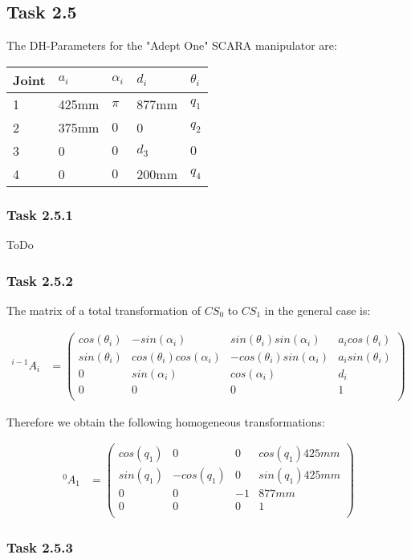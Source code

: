 \subsection*{Task 2.5}
The DH-Parameters for the "Adept One" SCARA manipulator are:
\begin{center}
	\begin{tabular}{ | l | l | l | l | l |}
		\hline
		Joint & $a_{i}$ & $\alpha_{i}$ & $d_i$ & $\theta_i$ \\ \hline
		1 & 425mm & $\pi$ & 877mm & $q_1$\\ \hline
		2 & 375mm & $0$ & 0 & $q_2$\\ \hline
		3 & 0 & $0$ & $d_3$ & $0$\\ \hline
		4 & 0 & $0$ & 200mm & $q_4$\\ \hline
	\end{tabular}
\end{center}
\subsubsection*{Task 2.5.1}
ToDo
\subsubsection*{Task 2.5.2}
The matrix of a total transformation of $CS_0$ to $CS_1$ in the general case is:

\begin{align*}
^{i-1}A_i &= 
\begin{pmatrix}
cos(\theta_i) & -sin(\alpha_i) & sin(\theta_i)sin(\alpha_i) & a_icos(\theta_i) \\
sin(\theta_i) & cos(\theta_i)cos(\alpha_i) & -cos(\theta_i)sin(\alpha_i) & a_isin(\theta_i) \\
0 & sin(\alpha_i) & cos(\alpha_i) & d_i \\
0 & 0 & 0 & 1 \\
\end{pmatrix}
\end{align*}

Therefore we obtain the following homogeneous transformations:

\begin{align*}
^0A_1 &= 
\begin{pmatrix}
cos(q_1) & 0 & 0 & cos(q_1)425mm \\
sin(q_1) & -cos(q_1) & 0 & sin(q_1)425mm \\
0 & 0 & -1 & 877mm \\
0 & 0 & 0 & 1 \\
\end{pmatrix}
\end{align*}


\subsubsection*{Task 2.5.3}